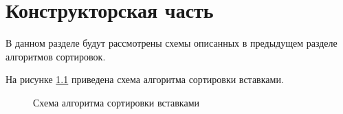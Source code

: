 \chapter{Конструкторская часть}

В данном разделе будут рассмотрены схемы описанных в предыдущем разделе алгоритмов сортировок.

На рисунке \ref{fig:insertion} приведена схема алгоритма сортировки вставками.

\begin{figure}[h!]
	
	
	\caption{Схема алгоритма сортировки вставками}
	
	\label{fig:insertion}
	
\end{figure}


